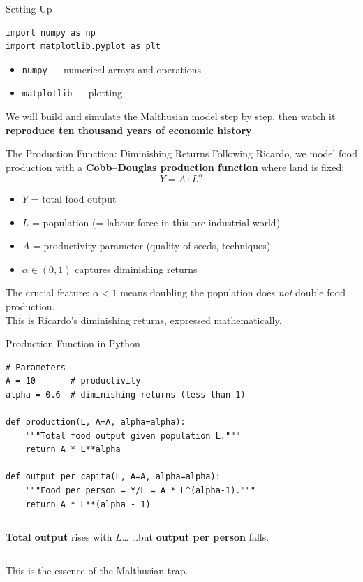 \documentclass[aspectratio=169, 10pt]{beamer}
\begin{document}
\begin{frame}[fragile]{Setting Up}
\begin{lstlisting}
import numpy as np
import matplotlib.pyplot as plt
\end{lstlisting}
\vspace{0.5em}
\begin{itemize}
  \item \texttt{numpy} --- numerical arrays and operations
  \item \texttt{matplotlib} --- plotting
\end{itemize}
\vspace{0.5em}
We will build and simulate the Malthusian model step by step,
then watch it \textbf{reproduce ten thousand years of economic history}.
\end{frame}

\begin{frame}{The Production Function: Diminishing Returns}
Following Ricardo, we model food production with a
\textbf{Cobb--Douglas production function} where land is fixed:
\[
  Y = A \cdot L^{\alpha}
\]
\begin{itemize}
  \item $Y$ = total food output
  \item $L$ = population (= labour force in this pre-industrial world)
  \item $A$ = productivity parameter (quality of seeds, techniques)
  \item $\alpha \in (0,1)$ captures \alert{diminishing returns}
\end{itemize}
\vspace{0.5em}
The crucial feature: $\alpha < 1$ means doubling the population
does \textit{not} double food production.\\[4pt]
This is Ricardo's diminishing returns, expressed mathematically.
\end{frame}

\begin{frame}[fragile]{Production Function in Python}
\begin{lstlisting}
# Parameters
A = 10       # productivity
alpha = 0.6  # diminishing returns (less than 1)

def production(L, A=A, alpha=alpha):
    """Total food output given population L."""
    return A * L**alpha

def output_per_capita(L, A=A, alpha=alpha):
    """Food per person = Y/L = A * L^(alpha-1)."""
    return A * L**(alpha - 1)
\end{lstlisting}
\vspace{0.3em}
\begin{columns}[T]
\textbf{Total output} rises with $L$\ldots
{}
\ldots but \textbf{output per person} falls.
\end{columns}
\vspace{0.3em}
This is the essence of the Malthusian trap.
\end{frame}
\end{document}
